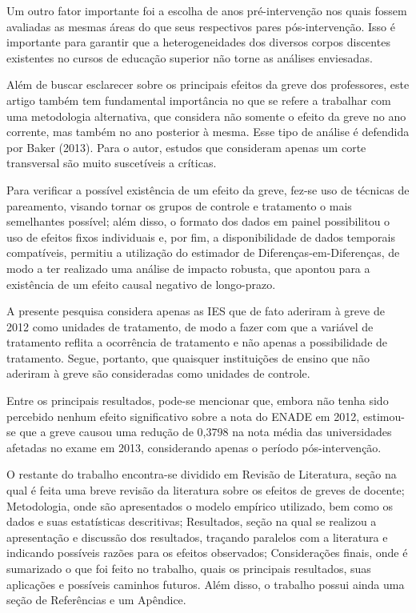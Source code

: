 Um outro fator importante foi a escolha de anos pré-intervenção nos quais fossem avaliadas as mesmas áreas do que seus respectivos pares pós-intervenção. Isso é importante para garantir que a heterogeneidades dos diversos corpos discentes existentes no cursos de educação superior não torne as análises enviesadas.

Além de buscar esclarecer sobre os principais efeitos da greve dos professores, este artigo também tem fundamental importância no que se refere a trabalhar com uma metodologia alternativa, que considera não somente o efeito da greve no ano corrente, mas também no ano posterior à mesma. Esse tipo de análise é defendida por Baker (2013). Para o autor, estudos que consideram apenas um corte transversal são muito suscetíveis a críticas.

Para verificar a possível existência de um efeito da greve, fez-se uso de técnicas de pareamento, visando tornar os grupos de controle e tratamento o mais semelhantes possível; além disso, o formato dos dados em painel possibilitou o uso de efeitos fixos individuais e, por fim, a disponibilidade de dados temporais compatíveis, permitiu a utilização do estimador de Diferenças-em-Diferenças, de modo a ter realizado uma análise de impacto robusta, que apontou para a existência de um efeito causal negativo de longo-prazo.

A presente pesquisa considera apenas as IES que de fato aderiram à greve de 2012 como unidades de tratamento, de modo a fazer com que a variável de tratamento reflita a ocorrência de tratamento e não apenas a possibilidade de tratamento. Segue, portanto, que quaisquer instituições de ensino que não aderiram à greve são consideradas como unidades de controle. 

Entre os principais resultados, pode-se mencionar que, embora não tenha sido percebido nenhum efeito significativo sobre a nota do ENADE em 2012, estimou-se que a greve causou uma redução de 0,3798 na nota média das universidades afetadas no exame em 2013, considerando apenas o período pós-intervenção.

O restante do trabalho encontra-se dividido em Revisão de Literatura, seção na qual é feita uma breve revisão da literatura sobre os efeitos de greves de docente; Metodologia, onde são apresentados o modelo empírico utilizado, bem como os dados e suas estatísticas descritivas; Resultados, seção na qual se realizou a apresentação e discussão dos resultados, traçando paralelos com a literatura e indicando possíveis razões para os efeitos observados; Considerações finais, onde é sumarizado o que foi feito no trabalho, quais os principais resultados, suas aplicações e possíveis caminhos futuros. Além disso, o trabalho possui ainda uma seção de Referências e um Apêndice.


